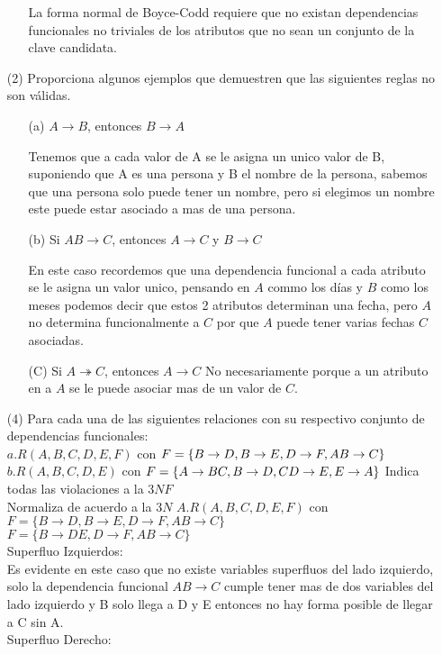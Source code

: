 \documentclass{article}
\begin{document}
\begin{enumerate}
\begin{enumerate}
      La forma normal de Boyce-Codd requiere que no existan dependencias
      funcionales no triviales de los atributos que no sean un conjunto de la
      clave candidata.
    \end{enumerate}
  \item[(2)] Proporciona algunos ejemplos que demuestren que las siguientes reglas
  no son válidas.
    \begin{enumerate}
      \item[(a)] $A \rightarrow B$, entonces $B \rightarrow A$

      Tenemos que a cada valor de A se le asigna un unico valor de B,
      suponiendo que A es una persona y B el nombre de la persona, sabemos que una
      persona solo puede tener un nombre, pero si elegimos un nombre este puede
      estar asociado a mas de una persona.
      \item[(b)] Si $AB \rightarrow C$, entonces $A \rightarrow C$ y $B \rightarrow C$

      En este caso recordemos que una dependencia funcional a cada atributo se le
      asigna un valor unico, pensando en $A$ commo los días y $B$ como los meses
      podemos decir que estos 2 atributos determinan una fecha, pero $A$ no
      determina funcionalmente a $C$ por que $A$ puede tener varias fechas $C$
      asociadas.

      \item[(C)] Si $A \twoheadrightarrow C$, entonces $A \rightarrow C$
      No necesariamente porque a un atributo en a $A$ se le puede asociar mas de
      un valor de $C$.

    \end{enumerate}
    \item[(4)] Para cada una de las siguientes relaciones con su respectivo conjunto de dependencias funcionales:\\
    $a. R(A,B,C,D,E,F)$ con $F = \{B\rightarrow D, B \rightarrow E, D \rightarrow F, AB \rightarrow C\}\\$
    $b. R(A,B,C,D,E)$ con $F = \{A \rightarrow BC, B \rightarrow D, CD \rightarrow E, E \rightarrow A\}\\$
    Indica todas las violaciones a la $3NF$\\
    Normaliza de acuerdo a la $3N$
    $A.  R(A,B,C,D,E,F)$ con $F = \{B \rightarrow D, B \rightarrow E, D \rightarrow F, AB \rightarrow C\}$\\
    $F=\{B \rightarrow DE, D \rightarrow F, AB \rightarrow C\}$\\
    Superfluo Izquierdos:\\
    Es evidente en este caso que no existe variables superfluos del lado izquierdo, solo la dependencia funcional $AB \rightarrow C$  cumple tener mas de dos variables del lado izquierdo y B solo llega a D y E entonces no hay forma posible de llegar a C sin A.\\
    Superfluo Derecho:


\end{enumerate}
\end{document}
